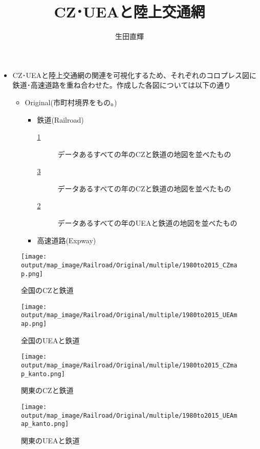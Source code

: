 \documentclass{ltjsarticle}
\title{CZ･UEAと陸上交通網}
\author{生田直輝}
\begin{document}
\maketitle

\begin{itemize}
  \item CZ･UEAと陸上交通網の関連を可視化するため、それぞれのコロプレス図に鉄道･高速道路を重ね合わせた。作成した各図については以下の通り
  \begin{itemize}
    \item Original(市町村境界をもの。)
    \begin{itemize}
      \item 鉄道(Railroad)
      \begin{description}
        \item[\ref{allCZandRail}] データあるすべての年のCZと鉄道の地図を並べたもの
        \item[\ref{KanCZandRail}] データあるすべての年のCZと鉄道の地図を並べたもの
        \item[\ref{allUEAandRail}] データあるすべての年のUEAと鉄道の地図を並べたもの
        \item[] 
      \end{description}
      \item 高速道路(Expway)
    \end{itemize}
  \end{itemize}
\end{itemize}


\begin{figure}[pbth]
  \centering
  \texttt{[image: output/map\_image/Railroad/Original/multiple/1980to2015\_CZmap.png]}
  \caption{\label{allCZandRail}全国のCZと鉄道}
\end{figure}

\begin{figure}[pbth]
  \centering
  \texttt{[image: output/map\_image/Railroad/Original/multiple/1980to2015\_UEAmap.png]}
  \caption{\label{allUEAandRail}全国のUEAと鉄道}
\end{figure}

\begin{figure}[pbth]
  \centering
  \texttt{[image: output/map\_image/Railroad/Original/multiple/1980to2015\_CZmap\_kanto.png]}
  \caption{\label{KanCZandRail}関東のCZと鉄道}
\end{figure}

\begin{figure}[pbth]
  \centering
  \texttt{[image: output/map\_image/Railroad/Original/multiple/1980to2015\_UEAmap\_kanto.png]}
  \caption{\label{KanUEAandRail}関東のUEAと鉄道}
\end{figure}
\end{document}
